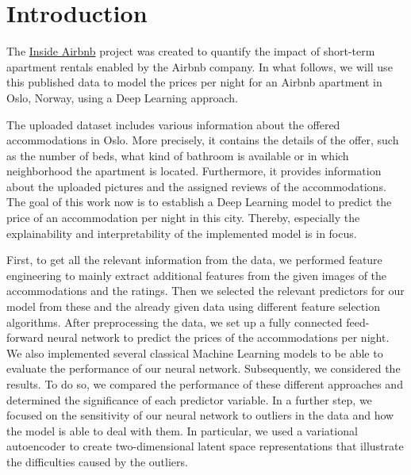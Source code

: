 \section{Introduction}


The \href{http://insideairbnb.com/get-the-data.html}{Inside Airbnb} project \citep{cox2022} was created to quantify the impact of short-term apartment rentals enabled by the Airbnb company.
In what follows, we will use this published data to model the prices per night for an Airbnb apartment in Oslo, Norway, using a Deep Learning approach.

The uploaded dataset includes various information about the offered accommodations in Oslo. More precisely, it contains the details of the offer, such as the number of beds, what kind of bathroom is available or in which neighborhood the apartment is located. Furthermore, it provides information about the uploaded pictures and the assigned reviews of the accommodations.
The goal of this work now is to establish a Deep Learning model to predict the price of an accommodation per night in this city. Thereby, especially the explainability and interpretability of the implemented model is in focus.

First, to get all the relevant information from the data, we performed feature engineering to mainly extract additional features from the given images of the accommodations and the ratings. Then we selected the relevant predictors for our model from these and the already given data using different feature selection algorithms. After preprocessing the data, we set up a fully connected feed-forward neural network to predict the prices of the accommodations per night. We also implemented several classical Machine Learning models to be able to evaluate the performance of our neural network.
Subsequently, we considered the results. To do so, we compared the performance of these different approaches and determined the significance of each predictor variable. In a further step, we focused on the sensitivity of our neural network to outliers in the data and how the model is able to deal with them. In particular, we used a variational autoencoder to create two-dimensional latent space representations that illustrate the difficulties caused by the outliers.

